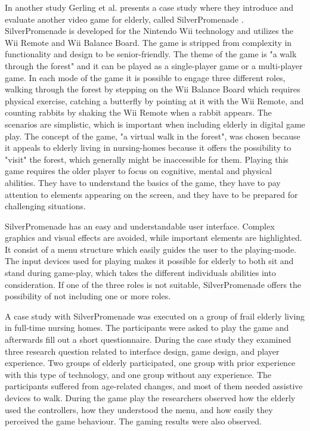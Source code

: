 In another study Gerling et al. presents a case study where they introduce and evaluate another video game for elderly, called SilverPromenade \cite{gerling2}.  SilverPromenade is developed for the Nintendo Wii technology and utilizes the Wii Remote and Wii Balance Board. The game is stripped from complexity in functionality and design to be senior-friendly. The theme of the game is "a walk through the forest" and it can be played as a single-player game or a multi-player game. In each mode of the game it is possible to engage three different roles, walking through the forest by stepping on the Wii Balance Board which requires physical exercise, catching a butterfly by pointing at it with the Wii Remote, and counting rabbits by shaking the Wii Remote when a rabbit appears. The scenarios are simplistic, which is important when including elderly in digital game play. The concept of the game, "a virtual walk in the forest", was chosen because it appeals to elderly living in nursing-homes because it offers the possibility to "visit" the forest, which generally might be inaccessible for them. Playing this game requires the older player to focus on cognitive, mental and physical abilities. They have to understand the basics of the game, they have to pay attention to elements appearing on the screen, and they have to be prepared for challenging situations. 

SilverPromenade has an easy and understandable user interface. Complex graphics and visual effects are avoided, while important elements are highlighted. It consist of a menu structure which easily guides the user to the playing-mode. The input devices used for playing makes it possible for elderly to both sit and stand during game-play, which takes the different individuals abilities into consideration.  If one of the three roles is not suitable, SilverPromenade offers the possibility of not including one or more roles.

A case study with SilverPromenade was executed on a group of frail elderly living in full-time nursing homes. The participants were asked to play the game and afterwards fill out a short questionnaire. During the case study they examined three research question related to interface design, game design, and player experience. Two groups of elderly participated, one group with prior experience with this type of technology, and one group without any experience. The participants suffered from age-related changes, and most of them needed assistive devices to walk. During the game play the researchers observed how the elderly used the controllers, how they understood the menu, and how easily they perceived the game behaviour. The gaming results were also observed.

